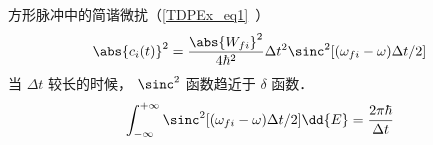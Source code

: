

方形脉冲中的简谐微扰（\autoref{TDPEx_eq1}~）
\begin{equation}
\abs{c_i(t)}^2 = \frac{\abs{W_{fi}}^2}{4\hbar^2} \Delta t^2 \sinc^2[(\omega_{fi}-\omega)\Delta t/2]
\end{equation}
当 $\Delta t$ 较长的时候， $\sinc^2$ 函数趋近于 $\delta$ 函数．
\begin{equation}
\int_{-\infty}^{+\infty} \sinc^2[(\omega_{fi}-\omega)\Delta t/2] \dd{E} = \frac{2\pi\hbar}{\Delta t}
\end{equation}
